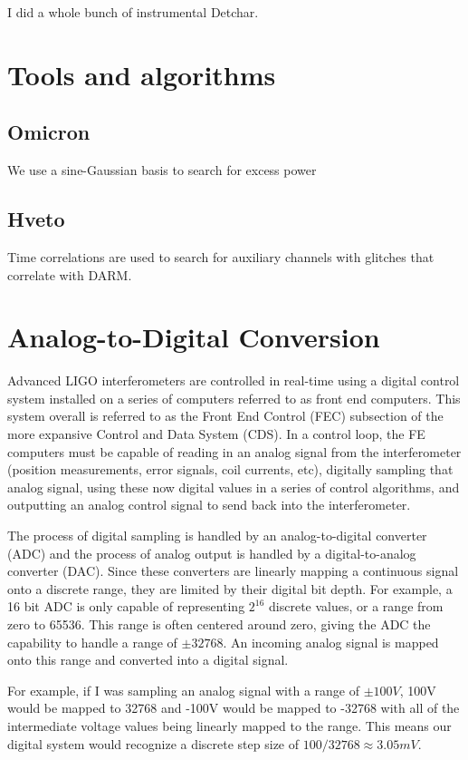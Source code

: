 I did a whole bunch of instrumental Detchar.

\section{Tools and algorithms}

\subsection{Omicron}

We use a sine-Gaussian basis to search for excess power

\subsection{Hveto}

Time correlations are used to search for auxiliary channels with glitches that 
correlate with DARM.

\section{Analog-to-Digital Conversion}

Advanced LIGO interferometers are controlled in real-time using a digital control system installed on a series of computers referred to as front end computers.  This system overall is referred to as the Front End Control (FEC) subsection of the more expansive Control and Data System (CDS).  In a control loop, the FE computers must be capable of reading in an analog signal from the interferometer (position measurements, error signals, coil currents, etc), digitally sampling that analog signal, using these now digital values in a series of control algorithms, and outputting an analog control signal to send back into the interferometer.

The process of digital sampling is handled by an analog-to-digital converter (ADC) and the process of analog output is handled by a digital-to-analog converter (DAC).  Since these converters are linearly mapping a continuous signal onto a discrete range, they are limited by their digital bit depth.  For example, a 16 bit ADC is only capable of representing $2^{16}$ discrete values, or a range from zero to 65536.  This range is often centered around zero, giving the ADC the capability to handle a range of $\pm32768$.  An incoming analog signal is mapped onto this range and converted into a digital signal.

For example, if I was sampling an analog signal with a range of $\pm100V$, 100V would be mapped to 32768 and -100V would be mapped to -32768 with all of the intermediate voltage values being linearly mapped to the range. This means our digital system would recognize a discrete step size of $100/32768 \approx 3.05 mV$.

